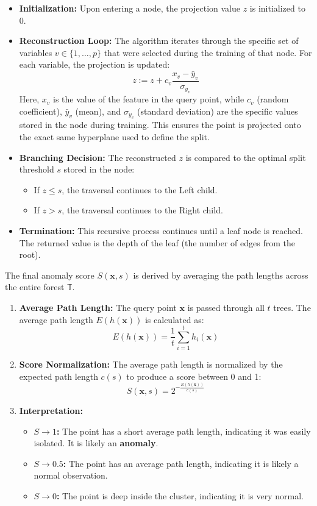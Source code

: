 \begin{itemize}
    \item \textbf{Initialization:} Upon entering a node, the projection value $z$ is initialized to 0.
    \item \textbf{Reconstruction Loop:} The algorithm iterates through the specific set of variables $v \in \{1, \dots, p\}$ that were selected during the training of that node. For each variable, the projection is updated:
    $$ z := z + c_v \frac{x_v - \bar{y}_v}{\sigma_{y_v}} $$
    Here, $x_v$ is the value of the feature in the query point, while $c_v$ (random coefficient), $\bar{y}_v$ (mean), and $\sigma_{y_v}$ (standard deviation) are the specific values stored in the node during training. This ensures the point is projected onto the exact same hyperplane used to define the split.
    \item \textbf{Branching Decision:} The reconstructed $z$ is compared to the optimal split threshold $s$ stored in the node:
    \begin{itemize}
        \item If $z \leq s$, the traversal continues to the Left child.
        \item If $z > s$, the traversal continues to the Right child.
    \end{itemize}
    \item \textbf{Termination:} This recursive process continues until a leaf node is reached. The returned value is the depth of the leaf (the number of edges from the root).
\end{itemize}

The final anomaly score $S(\mathbf{x}, s)$ is derived by averaging the path lengths across the entire forest $\mathbb{T}$.

\begin{enumerate}
    \item \textbf{Average Path Length:} The query point $\mathbf{x}$ is passed through all $t$ trees. The average path length $E(h(\mathbf{x}))$ is calculated as:
    $$ E(h(\mathbf{x})) = \frac{1}{t} \sum_{i=1}^{t} h_i(\mathbf{x}) $$
    \item \textbf{Score Normalization:} The average path length is normalized by the expected path length $c(s)$ to produce a score between 0 and 1:
    $$ S(\mathbf{x}, s) = 2^{-\frac{E(h(\mathbf{x}))}{c(s)}} $$
    \item \textbf{Interpretation:}
    \begin{itemize}
        \item \textbf{$S \to 1$:} The point has a short average path length, indicating it was easily isolated. It is likely an \textbf{anomaly}.
        \item \textbf{$S \to 0.5$:} The point has an average path length, indicating it is likely a normal observation.
        \item \textbf{$S \to 0$:} The point is deep inside the cluster, indicating it is very normal.
    \end{itemize}
\end{enumerate}

